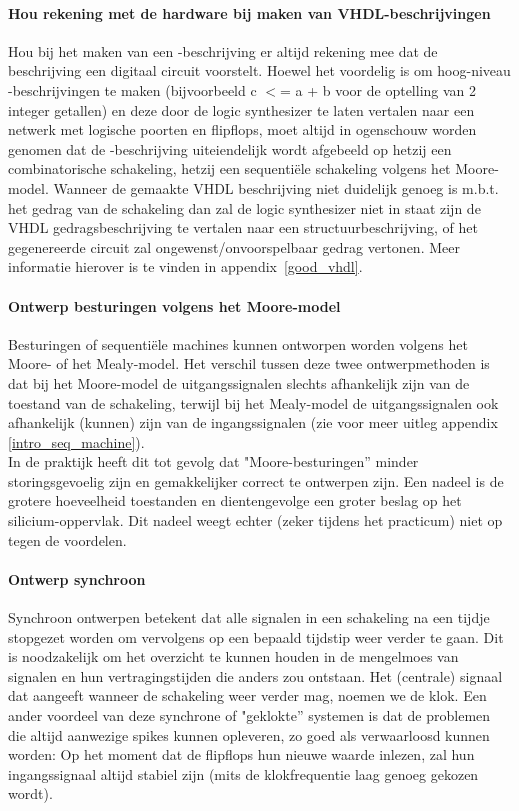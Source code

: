 \paragraph{Hou rekening met de hardware bij maken van VHDL-beschrijvingen}
Hou bij het maken van een -beschrijving er altijd rekening mee dat
de beschrijving een digitaal circuit voorstelt.
Hoewel het voordelig is om hoog-niveau -beschrijvingen te maken 
(bijvoorbeeld c $<$= a + b voor de optelling van 2 integer getallen)
en deze door de logic synthesizer te laten vertalen 
naar een netwerk met logische poorten en flipflops,
moet altijd in ogenschouw worden genomen dat de -beschrijving
uiteiendelijk wordt afgebeeld op hetzij een combinatorische schakeling, 
hetzij een sequenti\"ele schakeling volgens het Moore-model.
Wanneer de gemaakte VHDL beschrijving niet duidelijk genoeg is m.b.t.
het gedrag van de schakeling dan zal de logic synthesizer niet in staat
zijn de VHDL gedragsbeschrijving te vertalen naar een structuurbeschrijving,
of het gegenereerde circuit zal ongewenst/onvoorspelbaar gedrag vertonen. 
Meer informatie hierover is te vinden in
appendix~\ref{good_vhdl}.

\paragraph{Ontwerp besturingen volgens het Moore-model}
Besturingen of sequenti\"ele machines kunnen ontworpen worden volgens het Moore- of het Mealy-model. 
Het verschil tussen deze twee ontwerpmethoden is dat bij het Moore-model de uitgangssignalen slechts 
afhankelijk zijn van de toestand van de schakeling, terwijl bij het Mealy-model de uitgangssignalen 
ook afhankelijk (kunnen) zijn van de ingangssignalen (zie voor meer uitleg appendix \ref{intro_seq_machine}).\\
In de praktijk heeft dit tot gevolg dat "Moore-besturingen'' minder storingsgevoelig zijn 
en gemakkelijker correct te ontwerpen zijn.
Een nadeel is de grotere hoeveelheid toestanden en dientengevolge
een groter beslag op het silicium-oppervlak.
Dit nadeel weegt echter (zeker tijdens het practicum) niet op tegen de voordelen.

\paragraph{Ontwerp synchroon}
Synchroon ontwerpen betekent dat alle signalen in een schakeling na een tijd\-je stopgezet worden om 
vervolgens op een bepaald tijdstip weer verder te gaan. 
Dit is noodzakelijk om het overzicht te kunnen houden in de mengelmoes van signalen en hun vertragingstijden 
die anders zou ontstaan. 
Het (centrale) signaal dat aangeeft wanneer de schakeling weer verder mag, noemen we de klok.
Een ander voordeel van deze synchrone of "geklokte'' systemen is dat de problemen die altijd 
aanwezige spikes kunnen opleveren, zo goed als verwaarloosd kunnen worden: 
Op het moment dat de flipflops hun nieuwe waarde inlezen, 
zal hun ingangssignaal altijd stabiel zijn (mits de klokfrequentie laag genoeg gekozen wordt).\\

